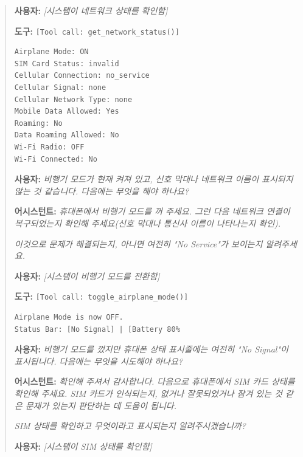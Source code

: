 \begin{quote}
\vspace{0.5em}
\noindent\textbf{사용자:} \textit{[시스템이 네트워크 상태를 확인함]}

\vspace{0.5em}
\noindent\textbf{도구:} \texttt{[Tool call: get\_network\_status()]}

\begin{verbatim}
Airplane Mode: ON
SIM Card Status: invalid
Cellular Connection: no_service
Cellular Signal: none
Cellular Network Type: none
Mobile Data Allowed: Yes
Roaming: No
Data Roaming Allowed: No
Wi-Fi Radio: OFF
Wi-Fi Connected: No
\end{verbatim}

\vspace{0.5em}
\noindent\textbf{사용자:} \textit{비행기 모드가 현재 켜져 있고, 신호 막대나 네트워크 이름이 표시되지 않는 것 같습니다. 다음에는 무엇을 해야 하나요?}

\vspace{0.5em}
\noindent\textbf{어시스턴트:} \textit{휴대폰에서 비행기 모드를 꺼 주세요. 그런 다음 네트워크 연결이 복구되었는지 확인해 주세요(신호 막대나 통신사 이름이 나타나는지 확인).}

\textit{이것으로 문제가 해결되는지, 아니면 여전히 "No Service"가 보이는지 알려주세요.}

\vspace{0.5em}
\noindent\textbf{사용자:} \textit{[시스템이 비행기 모드를 전환함]}

\vspace{0.5em}
\noindent\textbf{도구:} \texttt{[Tool call: toggle\_airplane\_mode()]}

\begin{verbatim}
Airplane Mode is now OFF.
Status Bar: [No Signal] | [Battery 80%
\end{verbatim}

\vspace{0.5em}
\noindent\textbf{사용자:} \textit{비행기 모드를 껐지만 휴대폰 상태 표시줄에는 여전히 "No Signal"이 표시됩니다. 다음에는 무엇을 시도해야 하나요?}

\vspace{0.5em}
\noindent\textbf{어시스턴트:} \textit{확인해 주셔서 감사합니다. 다음으로 휴대폰에서 SIM 카드 상태를 확인해 주세요. SIM 카드가 인식되는지, 없거나 잘못되었거나 잠겨 있는 것 같은 문제가 있는지 판단하는 데 도움이 됩니다.}

\textit{SIM 상태를 확인하고 무엇이라고 표시되는지 알려주시겠습니까?}

\vspace{0.5em}
\noindent\textbf{사용자:} \textit{[시스템이 SIM 상태를 확인함]}


\end{quote}
